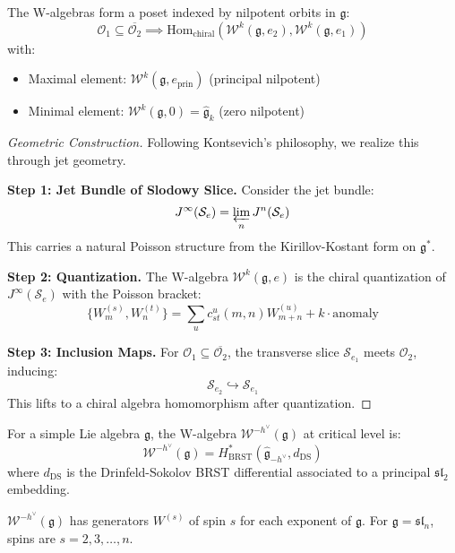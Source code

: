 \begin{theorem}\label{thm:w-poset}
The W-algebras form a poset indexed by nilpotent orbits in $\mathfrak{g}$:
\[
\mathcal{O}_1 \subseteq \overline{\mathcal{O}_2} \implies 
\text{Hom}_{\text{chiral}}(\mathcal{W}^k(\mathfrak{g}, e_2), \mathcal{W}^k(\mathfrak{g}, e_1))
\]
with:
\begin{itemize}
\item Maximal element: $\mathcal{W}^k(\mathfrak{g}, e_{\text{prin}})$ (principal nilpotent)
\item Minimal element: $\mathcal{W}^k(\mathfrak{g}, 0) = \widehat{\mathfrak{g}}_k$ (zero nilpotent)
\end{itemize}
\end{theorem}
 
\begin{proof}[Geometric Construction]
Following Kontsevich's philosophy, we realize this through jet geometry.
 
\textbf{Step 1: Jet Bundle of Slodowy Slice.} Consider the jet bundle:
\[
J^{\infty}(\mathcal{S}_e) = \varprojlim_{n} J^n(\mathcal{S}_e)
\]
This carries a natural Poisson structure from the Kirillov-Kostant form on $\mathfrak{g}^*$.
 
\textbf{Step 2: Quantization.} The W-algebra $\mathcal{W}^k(\mathfrak{g}, e)$ is the chiral 
quantization of $J^{\infty}(\mathcal{S}_e)$ with the Poisson bracket:
\[
\{W^{(s)}_m, W^{(t)}_n\} = \sum_{u} c_{st}^u(m,n) W^{(u)}_{m+n} + k \cdot \text{anomaly}
\]
 
\textbf{Step 3: Inclusion Maps.} For $\mathcal{O}_1 \subseteq \overline{\mathcal{O}_2}$, the 
transverse slice $\mathcal{S}_{e_1}$ meets $\mathcal{O}_2$, inducing:
\[
\mathcal{S}_{e_2} \hookrightarrow \mathcal{S}_{e_1}
\]
This lifts to a chiral algebra homomorphism after quantization.
\end{proof}
 
\begin{definition}
For a simple Lie algebra $\mathfrak{g}$, the W-algebra $\mathcal{W}^{-h^\vee}(\mathfrak{g})$ at critical 
level is:
\[
\mathcal{W}^{-h^\vee}(\mathfrak{g}) = H^*_{\text{BRST}}(\widehat{\mathfrak{g}}_{-h^\vee}, d_{\text{DS}})
\]
where $d_{\text{DS}}$ is the Drinfeld-Sokolov BRST differential associated to a principal $\mathfrak{sl}_2$ 
embedding.
\end{definition}
 
\begin{remark}[Generators]
$\mathcal{W}^{-h^\vee}(\mathfrak{g})$ has generators $W^{(s)}$ of spin $s$ for each exponent of $\mathfrak{g}$. 
For $\mathfrak{g} = \mathfrak{sl}_n$, spins are $s = 2, 3, \ldots, n$.
\end{remark}
 
